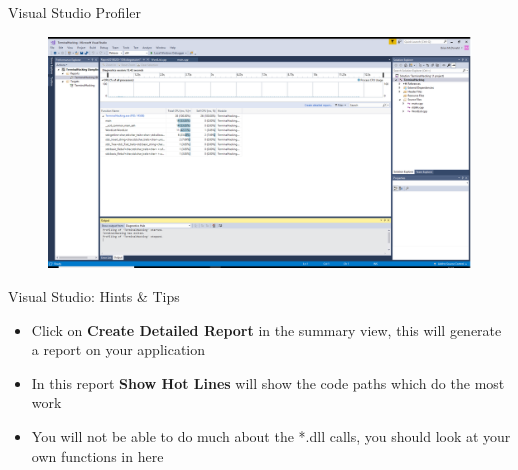\begin{frame}{Visual Studio Profiler}
\begin{figure}
	\includegraphics[width=1.0\textwidth,height=0.8\textheight]{VSProfilerWindow}
\end{figure}
\end{frame}

\begin{frame}{Visual Studio: Hints \& Tips}
\begin{itemize}
	\pause \item Click on \textbf{Create Detailed Report} in the summary view, this will generate a report on your application
	\pause \item In this report \textbf{Show Hot Lines} will show the code paths which do the  most work
	\pause \item You will not be able to do much about the *.dll calls, you should look at your own functions in here
\end{itemize}
\end{frame}
